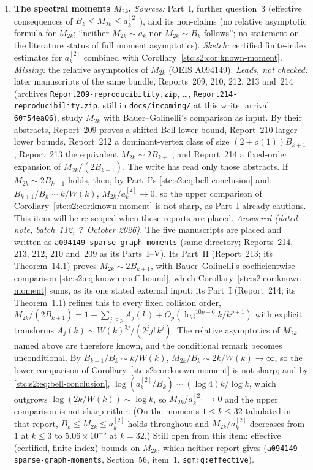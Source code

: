 \documentclass[11pt,letterpaper]{article}
\numberwithin{equation}{section}
\theoremstyle{remark}\newtheorem{remark}[theorem]{Remark}
\newcommand{\file}[1]{\nolinkurl{#1}}
\begin{document}
\begin{enumerate}
\item\label{stc:q:moments} \textbf{The spectral moments $M_{2k}$.} \emph{Sources:} Part~I, further question~3 (effective consequences of $B_k\le M_{2k}\le a^{[2]}_k$), and its non-claims (no relative asymptotic formula for $M_{2k}$; ``neither $M_{2k}\sim a_k$ nor $M_{2k}\sim B_k$ follows''; no statement on the literature status of full moment asymptotics). \emph{Sketch:} certified finite-index estimates for $a^{[2]}_k$ combined with Corollary~\ref{stc:s2:cor:known-moment}. \emph{Missing:} the relative asymptotics of $M_{2k}$ (OEIS A094149). \emph{Leads, not checked:} later manuscripts of the same bundle, Reports~209, 210, 212, 213 and~214 (archives \file{Report209-reproducibility.zip}, \dots, \file{Report214-reproducibility.zip}, still in \file{docs/incoming/} at this write; arrival \texttt{60f54ea06}), study $M_{2k}$ with Bauer--Golinelli's comparison as input. By their abstracts, Report~209 proves a shifted Bell lower bound, Report~210 larger lower bounds, Report~212 a dominant-vertex class of size $(2+o(1))B_{k+1}$, Report~213 the equivalent $M_{2k}\sim2B_{k+1}$, and Report~214 a fixed-order expansion of $M_{2k}/(2B_{k+1})$. The write has read only those abstracts. If $M_{2k}\sim2B_{k+1}$ holds, then, by Part~I's \eqref{stc:s2:eq:bell-conclusion} and $B_{k+1}/B_k\sim k/W(k)$, $M_{2k}/a^{[2]}_k\to0$, so the upper comparison of Corollary~\ref{stc:s2:cor:known-moment} is not sharp, as Part~I already cautions. This item will be re-scoped when those reports are placed.
\emph{Answered (dated note, batch~112, 7~October 2026).} The five manuscripts are placed and written as \file{a094149-sparse-graph-moments} (same directory; Reports~214, 213, 212, 210 and~209 as its Parts~I--V). Its Part~II (Report~213; its Theorem~14.1) proves $M_{2k}\sim2B_{k+1}$, with Bauer--Golinelli's coefficientwise comparison \eqref{stc:s2:eq:known-coeff-bound}, which Corollary~\ref{stc:s2:cor:known-moment} sums, as its one stated external input; its Part~I (Report~214; its Theorem~1.1) refines this to every fixed collision order, $M_{2k}/(2B_{k+1})=1+\sum_{j\le p}A_j(k)+O_p(\log^{10p+6}k/k^{p+1})$ with explicit transforms $A_j(k)\sim W(k)^{3j}/(2^jj!\,k^j)$. The relative asymptotics of $M_{2k}$ named above are therefore known, and the conditional remark becomes unconditional. By $B_{k+1}/B_k\sim k/W(k)$, $M_{2k}/B_k\sim2k/W(k)\to\infty$, so the lower comparison of Corollary~\ref{stc:s2:cor:known-moment} is not sharp; and by \eqref{stc:s2:eq:bell-conclusion}, $\log(a^{[2]}_k/B_k)\sim(\log4)k/\log k$, which outgrows $\log(2k/W(k))\sim\log k$, so $M_{2k}/a^{[2]}_k\to0$ and the upper comparison is not sharp either. (On the moments $1\le k\le32$ tabulated in that report, $B_k\le M_{2k}\le a^{[2]}_k$ holds throughout and $M_{2k}/a^{[2]}_k$ decreases from $1$ at $k\le3$ to $5.06\times10^{-5}$ at $k=32$.) Still open from this item: effective (certified, finite-index) bounds on $M_{2k}$, which neither report gives (\file{a094149-sparse-graph-moments}, Section~56, item~1, \file{sgm:q:effective}).

\end{enumerate}
\end{document}

